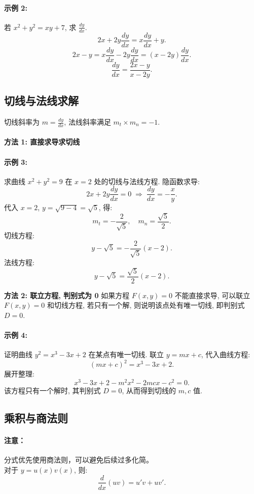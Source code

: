 \documentclass[8pt,a4paper,twoside]{tau-class/tau}
\begin{document}
\paragraph{示例 2:} 若 $x^2 + y^2 = xy + 7$, 求 $\tfrac{dy}{dx}$.
\[
    2x + 2y\frac{dy}{dx} = x\frac{dy}{dx} + y.
\]
\[
    2x − y = x\frac{dy}{dx} − 2y\frac{dy}{dx} = (x − 2y)\frac{dy}{dx}.
\]
\[
    \frac{dy}{dx} = \frac{2x − y}{x − 2y}.
\]

\subsection{切线与法线求解}
切线斜率为 $m = \tfrac{dy}{dx}$, 法线斜率满足 $m_t × m_n = −1$.

\paragraph{方法 1: 直接求导求切线}
\paragraph{示例 3:} 求曲线 $x^2 + y^2 = 9$ 在 $x = 2$ 处的切线与法线方程.
隐函数求导:
\[
    2x + 2y\frac{dy}{dx} = 0 \;\Longrightarrow\; \frac{dy}{dx} = −\frac{x}{y}.
\]
代入 $x = 2$, $y = \sqrt{9 − 4} = \sqrt{5}$, 得:
\[
    m_t = −\frac{2}{\sqrt{5}}, \quad m_n = \frac{\sqrt{5}}{2}.
\]
切线方程:
\[
    y − \sqrt{5} = −\frac{2}{\sqrt{5}}(x − 2).
\]
法线方程:
\[
    y − \sqrt{5} = \frac{\sqrt{5}}{2}(x − 2).
\]

\textbf{方法 2: 联立方程, 判别式为 0}
如果方程 $F(x, y) = 0$ 不能直接求导, 可以联立 $F(x,y) = 0$ 和切线方程, 若只有一个解, 则说明该点处有唯一切线, 即判别式 $D = 0$.

\paragraph{示例 4:} 证明曲线 $y^2 = x^3 − 3x + 2$ 在某点有唯一切线.
联立 $y = mx + c$, 代入曲线方程:
\[
    (mx + c)^2 = x^3 − 3x + 2.
\]
展开整理:
\[
    x^3 − 3x + 2 − m^2x^2 − 2mcx − c^2 = 0.
\]
该方程只有一个解时, 其判别式 $D = 0$, 从而得到切线的 $m, c$ 值.

\subsection{乘积与商法则}
\paragraph{注意：}分式优先使用商法则，可以避免后续过多化简。\\
对于 $y = u(x)v(x)$, 则:
\[
    \frac{d}{dx}(uv) = u'v + uv'.
\]
\end{document}
